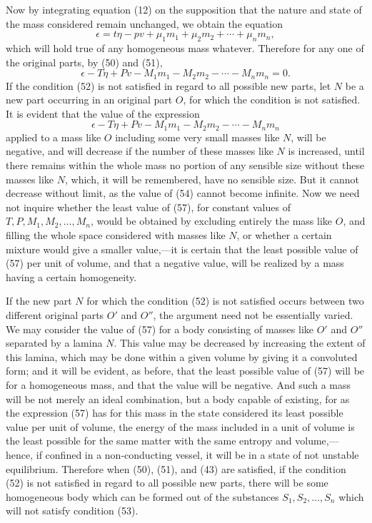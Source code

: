 \documentclass[11pt]{article}
\begin{document}
Now by integrating equation (12) on the supposition that the nature and state of the mass considered remain unchanged, we obtain the equation
\begin{equation}
\epsilon=t\eta-pv+\mu_1m_1+\mu_2m_2+\cdots+\mu_nm_n,
\end{equation}
which will hold true of any homogeneous mass whatever. Therefore for any one of the original parts, by (50) and (51),
\begin{equation}
\epsilon-T\eta+Pv-M_1m_1-M_2m_2-\cdots-M_nm_n=0.
\end{equation}
If the condition (52) is not satisfied in regard to all possible new parts, let \(N\) be a new part occurring in an original part \(O\), for which the condition is not satisfied. It is evident that the value of the expression
\begin{equation}
\epsilon-T\eta+Pv-M_1m_1-M_2m_2-\cdots-M_nm_n
\end{equation}
applied to a mass like \(O\) including some very small masses like \(N\), will be negative, and will decrease if the number of these masses like \(N\) is increased, until there remains within the whole mass no portion of any sensible size without these masses like \(N\), which, it will be remembered, have no sensible size. But it cannot decrease without limit, as the value of (54) cannot become infinite. Now we need not inquire whether the least value of (57), for constant values of \(T,P,M_1,M_2,\ldots,M_n\), would be obtained by excluding entirely the mass like \(O\), and filling the whole space considered with masses like \(N\), or whether a certain mixture would give a smaller value,---it is certain that the least possible value of (57) per unit of volume, and that a negative value, will be realized by a mass having a certain homogeneity.

If the new part \(N\) for which the condition (52) is not satisfied occurs between two different original parts \(O'\) and \(O''\), the argument need not be essentially varied. We may consider the value of (57) for a body consisting of masses like \(O'\) and \(O''\) separated by a lamina \(N\). This value may be decreased by increasing the extent of this lamina, which may be done within a given volume by giving it a convoluted form; and it will be evident, as before, that the least possible value of (57) will be for a homogeneous mass, and that the value will be negative. And such a mass will be not merely an ideal combination, but a body capable of existing, for as the expression (57) has for this mass in the state considered its least possible value per unit of volume, the energy of the mass included in a unit of volume is the least possible for the same matter with the same entropy and volume,---hence, if confined in a non-conducting vessel, it will be in a state of not unstable equilibrium. Therefore when (50), (51), and (43) are satisfied, if the condition (52) is not satisfied in regard to all possible new parts, there will be some homogeneous body which can be formed out of the substances \(S_1,S_2,\ldots,S_n\) which will not satisfy condition (53).
\end{document}
